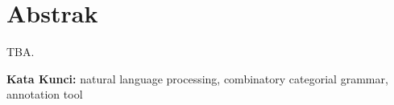 \chapter*{Abstrak}


TBA.

\vspace{0.5 cm}
\begin{flushleft}
{\textbf{Kata Kunci:}
  natural language processing, combinatory categorial grammar, annotation tool
}
\end{flushleft}
